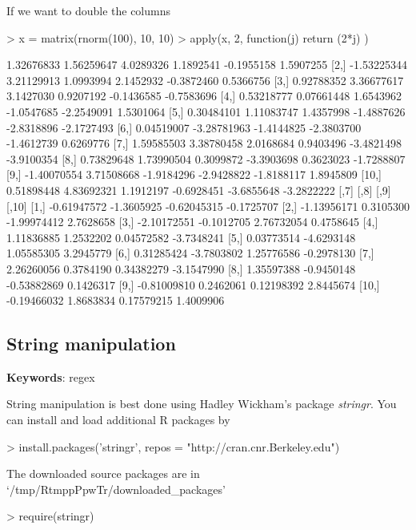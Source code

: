 \documentclass{article}
\begin{document}
If we want to double the columns

\begin{Schunk}
\begin{Sinput}
> x = matrix(rnorm(100), 10, 10)
> apply(x, 2, function(j) { return (2*j) } )
\end{Sinput}
\begin{Soutput}
             [,1]        [,2]       [,3]       [,4]       [,5]       [,6]
 [1,]  1.32676833  1.56259647  4.0289326  1.1892541 -0.1955158  1.5907255
 [2,] -1.53225344  3.21129913  1.0993994  2.1452932 -0.3872460  0.5366756
 [3,]  0.92788352  3.36677617  3.1427030  0.9207192 -0.1436585 -0.7583696
 [4,]  0.53218777  0.07661448  1.6543962 -1.0547685 -2.2549091  1.5301064
 [5,]  0.30484101  1.11083747  1.4357998 -1.4887626 -2.8318896 -2.1727493
 [6,]  0.04519007 -3.28781963 -1.4144825 -2.3803700 -1.4612739  0.6269776
 [7,]  1.59585503  3.38780458  2.0168684  0.9403496 -3.4821498 -3.9100354
 [8,]  0.73829648  1.73990504  0.3099872 -3.3903698  0.3623023 -1.7288807
 [9,] -1.40070554  3.71508668 -1.9184296 -2.9428822 -1.8188117  1.8945809
[10,]  0.51898448  4.83692321  1.1912197 -0.6928451 -3.6855648 -3.2822222
             [,7]       [,8]        [,9]      [,10]
 [1,] -0.61947572 -1.3605925 -0.62045315 -0.1725707
 [2,] -1.13956171  0.3105300 -1.99974412  2.7628658
 [3,] -2.10172551 -0.1012705  2.76732054  0.4758645
 [4,]  1.11836885  1.2532202  0.04572582 -3.7348241
 [5,]  0.03773514 -4.6293148  1.05585305  3.2945779
 [6,]  0.31285424 -3.7803802  1.25776586 -0.2978130
 [7,]  2.26260056  0.3784190  0.34382279 -3.1547990
 [8,]  1.35597388 -0.9450148 -0.53882869  0.1426317
 [9,] -0.81009810  0.2462061  0.12198392  2.8445674
[10,] -0.19466032  1.8683834  0.17579215  1.4009906
\end{Soutput}
\end{Schunk}

\subsection{String manipulation}
\textbf{Keywords}: regex

String manipulation is best done using Hadley Wickham's package \textit{stringr}.
You can install and load additional R packages by

\begin{Schunk}
\begin{Sinput}
> install.packages('stringr', repos = "http://cran.cnr.Berkeley.edu")
\end{Sinput}
\begin{Soutput}
The downloaded source packages are in
	‘/tmp/RtmppPpwTr/downloaded_packages’
\end{Soutput}
\begin{Sinput}
> require(stringr)
\end{Sinput}
\end{Schunk}
\end{document}
